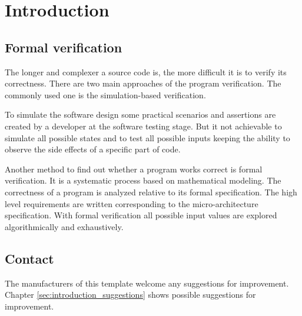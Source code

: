 \chapter{Introduction}
\label{chap:introduction}


\nocite{kopka:band1}
\nocite{raichle:bibtex_programmierung}
\nocite{MiKTeX}
\nocite{KOMA}
\nocite{TeXnicCenter}
\nocite{Marti06}
\nocite{Erbsland08}
\nocite{juergens:einfuehrung}
\nocite{juergens:fortgeschritten}

\section{Formal verification}
\label{sec:formal_verification}

The longer and complexer a source code is, the more difficult it is to verify its correctness.
There are two main approaches of the program verification. The commonly used one is the simulation-based verification.

To simulate the software design some practical scenarios and assertions are created by a developer at the software testing stage. 
But it not achievable to simulate all possible states and to test all possible inputs keeping the ability to observe the side effects of a specific part of code.

Another method to find out whether a program works correct is formal verification. It is a systematic process based on mathematical modeling.
The correctness of a program is analyzed relative to its formal specification. The high level requirements are written corresponding to the micro-architecture specification.
With formal verification all possible input values are explored algorithmically and exhaustively. \cite{sanghavi:formal_verification}




\section{Contact}
\label{sec:introduction_contact}

The manufacturers of this template welcome any suggestions for improvement. Chapter \ref{sec:introduction_suggestions} shows possible suggestions for improvement.

